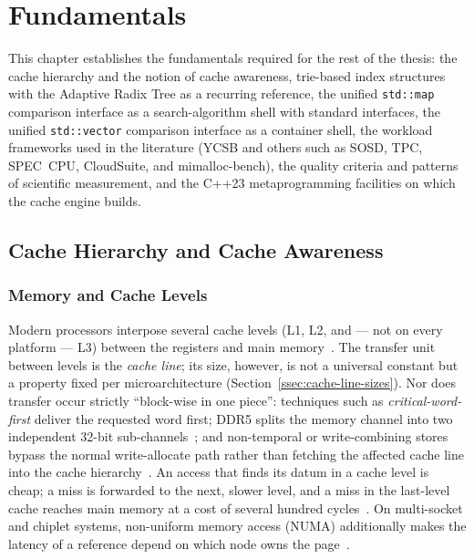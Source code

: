 \chapter{Fundamentals}\label{ch:fundamentals}

This chapter establishes the fundamentals required for the rest of the thesis: the cache hierarchy
and the notion of cache awareness, trie-based index structures with the Adaptive Radix Tree as a
recurring reference, the unified \texttt{std::map} comparison interface as a search-algorithm shell
with standard interfaces, the unified \texttt{std::vector} comparison interface as a container
shell, the workload frameworks used in the literature (YCSB and others such as SOSD, TPC, SPEC~CPU,
CloudSuite, and mimalloc-bench), the quality criteria and patterns of scientific measurement, and
the C++23 metaprogramming facilities on which the cache engine builds.

\section{Cache Hierarchy and Cache Awareness}\label{sec:cache-basics}
\subsection{Memory and Cache Levels}\label{ssec:cache-levels}
Modern processors interpose several cache levels (L1, L2, and --- not on every platform --- L3)
between the registers and main memory~\cite{hennessy2019architecture}. The transfer unit between
levels is the \emph{cache line}; its size, however, is not a universal constant but a property fixed
per microarchitecture (Section~\ref{ssec:cache-line-sizes}). Nor does transfer occur strictly
``block-wise in one piece'': techniques such as \emph{critical-word-first} deliver the requested
word first; DDR5 splits the memory channel into two independent 32-bit
sub-channels~\cite{micron_ddr5}; and non-temporal or write-combining stores bypass the normal
write-allocate path rather than fetching the affected cache line into the cache
hierarchy~\cite{intel_sdm}. An access that finds its datum in a cache level is cheap; a miss is
forwarded to the next, slower level, and a miss in the last-level cache reaches main memory at a
cost of several hundred cycles~\cite{hennessy2019architecture,drepper2007memory}. On multi-socket
and chiplet systems, non-uniform memory access (NUMA) additionally makes the latency of a reference
depend on which node owns the page~\cite{drepper2007memory}.

